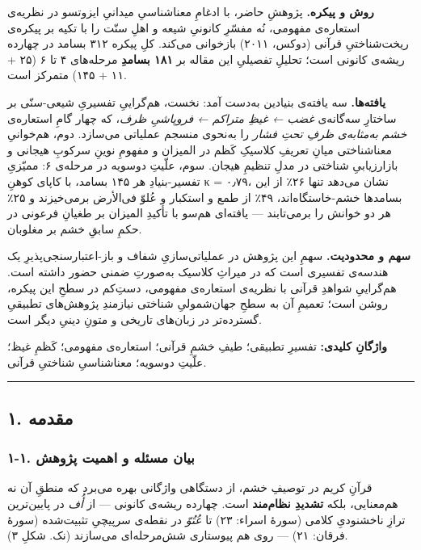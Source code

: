 \documentclass[12pt,a4paper]{article}
\begin{document}
\begin{RTL}
\begin{otherlanguage}{persian}
\textbf{روش و پیکره.} پژوهشِ حاضر، با ادغامِ معناشناسیِ میدانیِ ایزوتسو در
نظریه‌ی استعاره‌ی مفهومی، نُه مفسّرِ کانونیِ شیعه و اهلِ سنّت را با تکیه بر
پیکره‌ی ریخت‌شناختیِ قرآنی (دوکس، ۲۰۱۱) بازخوانی می‌کند. کلِ پیکره ۳۱۲ بسامد
در چهارده ریشه‌ی کانونی است؛ تحلیلِ تفصیلیِ این مقاله بر \textbf{۱۸۱ بسامدِ}
مرحله‌های ۴ تا ۶ (۲۵ + ۱۱ + ۱۴۵) متمرکز است.

\textbf{یافته‌ها.} سه یافته‌ی بنیادین به‌دست آمد: نخست، هم‌گراییِ تفسیریِ
شیعی-سنّی بر ساختارِ سه‌گانه‌ی \emph{غضب ← غیظِ متراکم ← فروپاشیِ ظرف}، که
چهار گامِ استعاره‌ی \emph{خشم به‌مثابه‌ی ظرفِ تحتِ فشار} را به‌نحوی منسجم
عملیاتی می‌سازد. دوم، هم‌خوانیِ معناشناختی میانِ تعریفِ کلاسیکِ کَظم در المیزان
و مفهومِ نوینِ سرکوبِ هیجانی و بازارزیابیِ شناختی در مدلِ تنظیمِ هیجان. سوم،
علّیتِ دوسویه در مرحله‌ی ۶: ممیّزیِ تفسیر-بنیادِ هر ۱۴۵ بسامد، با کاپای کوهنِ κ
= ۰٫۷۹، نشان می‌دهد تنها ۲۶٪ از این بسامدها خشم-خاستگاه‌اند، ۴۹٪ از طمع و
استکبار و عُلوّ فی‌الأرض برمی‌خیزند و ۲۵٪ هر دو خوانش را برمی‌تابند ---
یافته‌ای هم‌سو با تأکیدِ المیزان بر طغیانِ فرعونی در حکمِ سابقِ خشم بر
مغلوبان.

\textbf{سهم و محدودیت.} سهمِ این پژوهش در عملیاتی‌سازیِ شفاف و
باز-اعتبارسنجی‌پذیرِ یک هندسه‌ی تفسیری است که در میراثِ کلاسیک به‌صورتِ ضمنی
حضور داشته است. هم‌گراییِ شواهدِ قرآنی با نظریه‌ی استعاره‌ی مفهومی، دستِ‌کم در
سطحِ این پیکره، روشن است؛ تعمیمِ آن به سطحِ جهان‌شمولیِ شناختی نیازمندِ
پژوهش‌های تطبیقیِ گسترده‌تر در زبان‌های تاریخی و متونِ دینیِ دیگر است.

\textbf{واژگانِ کلیدی:} تفسیرِ تطبیقی؛ طیفِ خشمِ قرآنی؛ استعاره‌ی مفهومی؛ کَظمِ
غیظ؛ علّیتِ دوسویه؛ معناشناسیِ شناختیِ قرآنی.

\begin{center}\rule{0.5\linewidth}{0.5pt}\end{center}

\subsection{۱. مقدمه}\label{ux645ux642ux62fux645ux647}

\subsubsection{۱-۱. بیان مسئله و اهمیت
پژوهش}\label{ux628ux6ccux627ux646-ux645ux633ux626ux644ux647-ux648-ux627ux647ux645ux6ccux62a-ux67eux698ux648ux647ux634}

قرآنِ کریم در توصیفِ خشم، از دستگاهی واژگانی بهره می‌برد که منطقِ آن نه
هم‌معنایی، بلکه \textbf{تشدیدِ نظام‌مند} است. چهارده ریشه‌ی کانونی --- از
\emph{أُف} در پایین‌ترین ترازِ ناخشنودیِ کلامی (سورۀ اسراء: ۲۳) تا
\emph{عُتُوّ} در نقطه‌ی سرپیچیِ تثبیت‌شده (سورۀ فرقان: ۲۱) --- روی هم پیوستاری
شش‌مرحله‌ای می‌سازند (نک. شکلِ ۳).


\end{otherlanguage}
\end{RTL}
\end{document}
